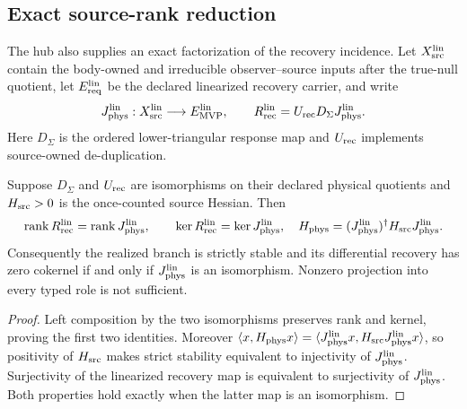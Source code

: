 \subsection{Exact source-rank reduction}

The hub also supplies an exact factorization of the recovery incidence.  Let
$X_{\rm src}^{\rm lin}$ contain the body-owned and irreducible
observer--source inputs after the true-null quotient, let
$E_{\rm req}^{\rm lin}$ be the declared linearized recovery carrier, and write
\begin{equation}
J_{\rm phys}^{\rm lin}:X_{\rm src}^{\rm lin}
\longrightarrow E_{\rm MVP}^{\rm lin},
\qquad
R_{\rm rec}^{\rm lin}=U_{\rm rec}D_\Sigma J_{\rm phys}^{\rm lin}.
\label{eq:recoveryfactorization}
\end{equation}
Here $D_\Sigma$ is the ordered lower-triangular response map and $U_{\rm rec}$
implements source-owned de-duplication.

\begin{proposition}
\label{prop:sourcerank}
Suppose $D_\Sigma$ and $U_{\rm rec}$ are isomorphisms on their declared
physical quotients and $H_{\rm src}>0$ is the once-counted source Hessian.
Then
\begin{equation}
\operatorname{rank}R_{\rm rec}^{\rm lin}
=\operatorname{rank}J_{\rm phys}^{\rm lin},
\qquad
\ker R_{\rm rec}^{\rm lin}=\ker J_{\rm phys}^{\rm lin},
\quad
H_{\rm phys}=(J_{\rm phys}^{\rm lin})^\dagger
H_{\rm src}J_{\rm phys}^{\rm lin}.
\label{eq:sourcerankcriterion}
\end{equation}
Consequently the realized branch is strictly stable and its differential
recovery has zero cokernel if and only if $J_{\rm phys}^{\rm lin}$ is an
isomorphism. Nonzero projection into every typed role is not sufficient.
\end{proposition}

\begin{proof}
Left composition by the two isomorphisms preserves rank and kernel, proving
the first two identities.  Moreover
$\langle x,H_{\rm phys}x\rangle
=\langle J_{\rm phys}^{\rm lin}x,H_{\rm src}
J_{\rm phys}^{\rm lin}x\rangle$, so positivity of
$H_{\rm src}$ makes strict stability equivalent to injectivity of
$J_{\rm phys}^{\rm lin}$. Surjectivity of the linearized recovery map is
equivalent to surjectivity of $J_{\rm phys}^{\rm lin}$. Both properties hold
exactly when the latter map is an isomorphism.
\end{proof}

